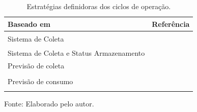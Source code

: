 \begin{table}[H]
	\centering
	\caption{Estratégias definidoras dos ciclos de operação.}
	\small
	\begin{tabularx}{\textwidth}{|X|X|}
		\hline
		\textbf{Baseado em} &\textbf{Referência} \\
		\hline
		\multirow{6}{*}{Sistema de Coleta} & \citeonline{choi_adaptive_2020}  \\
		& \citeonline{balsamo_graceful_2016} \\
				&\citeonline{balsamo_hibernus_2016}\\
					&	\citeonline{khairnar_discrete-rate_2015} \\

		&\citeonline{benhamaid_recent_2022} \\
		&\citeonline{doumenis_lightweight_2022}\\

		\hline
		\multirow{4}{*}{Sistema de Coleta e Status Armazenamento} & \citeonline{kansal_power_2007}\\
			& \citeonline{khairnar_power_2011} \\
		&	\citeonline{sudevalayam_energy_2011} \\
		&   \citeonline{yoo_dynamic_2012}\\
		\hline
		\multirow{3}{*}{Previsão de coleta} &\citeonline{ge_adaptive_2020}\\
			&	\citeonline{zhang_toward_2018}\\
			&	\citeonline{gong_sleep_2022}\\
		\hline
		\multirow{7}{*}{Previsão de consumo} & \citeonline{arnaiz_energy_2024}\\		
			& \citeonline{lee_energy_2018}\\
			& \citeonline{luo_optimal_2017} \\
			& \citeonline{liu_energy_2016}\\
			& \citeonline{liu_performance_2015}\\
			& \citeonline{jaber_reducing_2017}\\
			& \citeonline{shen_energy-efficient_2019}\\
			\hline
		
		
		
	\end{tabularx}
	\label{table:cap3:solucoesparajaneladeoperacoes}
	
	Fonte: Elaborado pelo autor.
\end{table}

